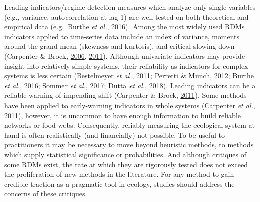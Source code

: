 \documentclass[print]{nuthesis}
\begin{document}
Leading indicators/regime detection measures which analyze only single variables (e.g., variance, autocorrelation at lag-1) are well-tested on both theoretical and empirical data (e.g.~Burthe \emph{et al.}, \protect\hyperlink{ref-burthe2016early}{2016}). Among the most widely used RDMs indicators applied to time-series data include an index of variance, moments around the grand mean (skewness and kurtosis), and critical slowing down (Carpenter \& Brock, \protect\hyperlink{ref-carpenter2006rising}{2006}, \protect\hyperlink{ref-carpenterBrock2011early}{2011}). Although univariate indicators may provide insight into relatively simple systems, their reliability as indicators for complex systems is less certain (Bestelmeyer \emph{et al.}, \protect\hyperlink{ref-bestelmeyer_analysis_2011}{2011}; Perretti \& Munch, \protect\hyperlink{ref-perretti2012regime}{2012}; Burthe \emph{et al.}, \protect\hyperlink{ref-burthe2016early}{2016}; Sommer \emph{et al.}, \protect\hyperlink{ref-sommer2017generic}{2017}; Dutta \emph{et al.}, \protect\hyperlink{ref-dutta2018robustness}{2018}). Leading indicators can be a reliable warning of impending shift (Carpenter \& Brock, \protect\hyperlink{ref-carpenterBrock2011early}{2011}). Some methods have been applied to early-warning indicators in whole systems (Carpenter \emph{et al.}, \protect\hyperlink{ref-carpenter2011early}{2011}), however, it is uncommon to have enough information to build reliable networks or food webs. Consequently, reliably measuring the ecological system at hand is often realistically (and financially) not possible. To be useful to practitioners it may be necessary to move beyond heuristic methods, to methods which supply statistical significance or probabilities. And although critiques of some RDMs exist, the rate at which they are rigorously tested does not exceed the proliferation of new methods in the literature. For any method to gain credible traction as a pragmatic tool in ecology, studies should address the concerns of these critiques.
\end{document}
